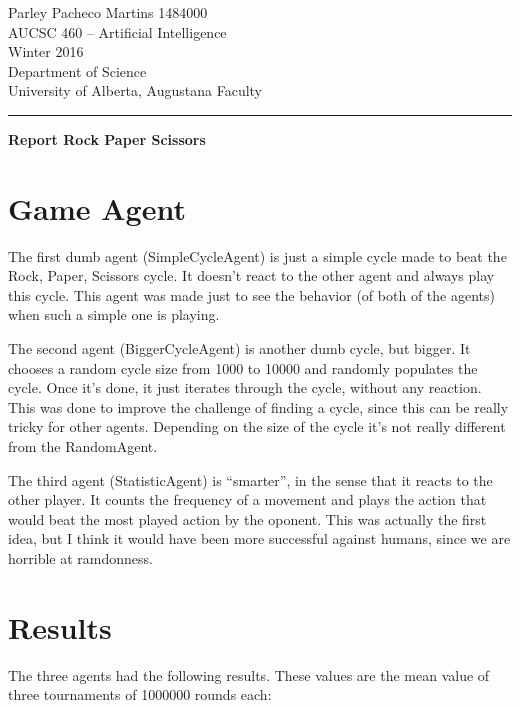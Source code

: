 \documentclass[12pt]{article}
\begin{document}
\noindent
Parley Pacheco Martins 1484000\\
AUCSC 460 -- Artificial Intelligence\\
Winter 2016\\
Department of Science\\
University of Alberta, Augustana Faculty

\vspace*{0.75\baselineskip}
\hrule
\vspace*{0.75\baselineskip}

\noindent
{\Large\bf Report Rock Paper Scissors }

\section{Game Agent}

The first dumb agent (SimpleCycleAgent) is just a simple cycle made to beat the Rock, Paper, Scissors cycle. It doesn't react to the other agent and always play this cycle. This agent was made just to see the behavior (of both of the agents) when such a simple one is playing.

The second agent (BiggerCycleAgent) is another dumb cycle, but bigger. It chooses a random cycle size from 1000 to 10000 and randomly populates the cycle.
Once it's done, it just iterates through the cycle, without any reaction. This was done to improve the challenge of finding a cycle, since this can be really tricky for other agents. Depending on the size of the cycle it's not really different from the RandomAgent.

The third agent (StatisticAgent) is ``smarter'', in the sense that it reacts to the other player. It counts the frequency of a movement and plays the action that would beat the most played action by the oponent. This was actually the first idea, but I think it would have been more successful against humans, since we are horrible at ramdonness.



\section{Results}

The three agents had the following results. These values are the mean value of three tournaments of 1000000 rounds each:
\end{document}
